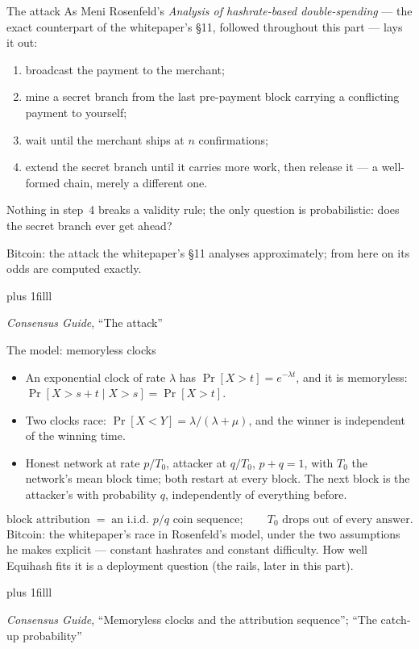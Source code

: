 \documentclass[aspectratio=169,11pt]{beamer}
\newcommand{\src}[1]{\par\vskip0pt plus 1filll
  {\fontsize{6}{7.2}\selectfont\color{arbdim}\raggedright #1\par}}
\begin{document}
\begin{frame}{The attack}
As Meni Rosenfeld's \emph{Analysis of hashrate-based double-spending}
--- the exact counterpart of the whitepaper's \S11, followed throughout
this part --- lays it out:
\begin{enumerate}
\item broadcast the payment to the merchant;
\item mine a secret branch from the last pre-payment block carrying a
  conflicting payment to yourself;
\item wait until the merchant ships at $n$ confirmations;
\item extend the secret branch until it carries more work, then release
  it --- a well-formed chain, merely a different one.
\end{enumerate}
\medskip
Nothing in step~4 breaks a validity rule; the only question is
probabilistic: does the secret branch ever get ahead?
\medskip

\alert{Bitcoin:} the attack the whitepaper's \S11 analyses
approximately; from here on its odds are computed exactly.
\src{\emph{Consensus Guide}, ``The attack''}
\end{frame}

\begin{frame}{The model: memoryless clocks}
\begin{itemize}
\item An exponential clock of rate $\lambda$ has
  $\Pr[X > t] = e^{-\lambda t}$, and it is memoryless:
  $\Pr[X > s + t \mid X > s] = \Pr[X > t]$.
\item Two clocks race: $\Pr[X < Y] = \lambda / (\lambda + \mu)$, and
  the winner is independent of the winning time.
\item Honest network at rate $p/T_0$, attacker at $q/T_0$, $p + q = 1$,
  with $T_0$ the network's mean block time; both restart at every
  block. The next block is the attacker's with probability $q$,
  independently of everything before.
\end{itemize}
\medskip
\[
  \text{block attribution} \;=\; \text{an i.i.d. } p/q
  \text{ coin sequence};\qquad T_0 \text{ drops out of every answer.}
\]
\medskip
\alert{Bitcoin:} the whitepaper's race in Rosenfeld's model, under the
two assumptions he makes explicit --- constant hashrates and constant
difficulty. How well Equihash fits it is a deployment question (the
rails, later in this part).
\src{\emph{Consensus Guide}, ``Memoryless clocks and the attribution
  sequence''; ``The catch-up probability''}
\end{frame}
\end{document}

